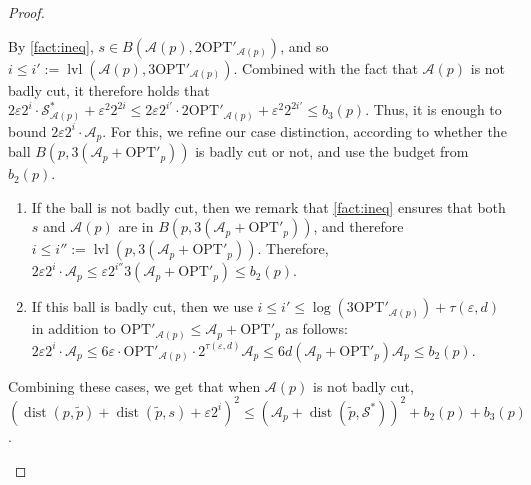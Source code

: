 \documentclass[11pt]{article}
\newcommand{\opt}{\text{OPT}}
\newcommand{\eps}{\varepsilon}
\renewcommand{\tilde}{\widetilde}
\newcommand{\calS}{\mathcal {S}}
\newcommand{\calL}{\mathcal{A}}
\newcommand{\offset}{\tau(\eps, d)}
\DeclareMathOperator{\dist}{dist}
\newcommand{\lpar}{\left(}
\newcommand{\rpar}{\right)}
\DeclareMathOperator{\level}{lvl}
\newcommand{\david}[1]{\textcolor{orange}{#1}}
\begin{document}
\begin{proof}
\begin{enumerate}
 By \cref{fact:ineq}, $s \in B(\calL(p), 2\opt'_{\calL(p)})$, and so
  $i \leq i' := \level\lpar \calL(p),  3\opt'_{\calL(p)}\rpar$. 
 Combined with the fact that $\calL(p)$ is not badly cut,  it therefore holds that 
 $2 \eps 2^i\cdot \calS^*_{\calL(p)} + \eps^2 2^{2i} \leq 2 \eps 2^{i'} \cdot 2\opt'_{\calL(p)} + \eps^2 2^{2i'} \leq b_3(p)$. 
 Thus, it is enough to bound $2  \eps 2^i \cdot \calL_p$. For this, we refine our case distinction, according to whether the ball $B(p, 3(\calL_p + \opt'_p))$ is badly cut or not, and use the budget from $b_2(p)$. 
 \begin{enumerate}
  \item If the ball is not badly cut, then we remark that \cref{fact:ineq} ensures  that both $s$ and $\calL(p)$ are in $B(p, 3(\calL_p + \opt'_p))$, and therefore $i \leq i'' := \level(p, 3(\calL_p + \opt'_p))$. Therefore, 
 $2  \eps 2^i \cdot\calL_p \leq \eps 2^{i''} 3(\calL_p + \opt'_p) \leq b_2(p)$.
  \item If this ball is badly cut, then we use $i \leq i' \leq \log(3\opt'_{\calL(p)}) + \offset$  in addition to $\opt'_{\calL(p)} \leq \calL_p + \opt'_p$ as follows:  
 $2  \eps 2^i \cdot\calL_p \leq 6 \eps \cdot \opt'_{\calL(p)} \cdot 2^{\offset} \calL_p \leq 6d (\calL_p + \opt'_p) \calL_p \leq b_2(p)$. %
 \end{enumerate}
 Combining these cases, we get that when $\calL(p)$ is not badly cut, $(\dist(p, \tilde p) + \dist(\tilde p, s) + \eps 2^i)^2 \leq (\calL_p + \dist(\tilde p, \calS^*))^2 + b_2(p) + b_3(p)$.
  \end{enumerate}



\end{proof}
\end{document}
